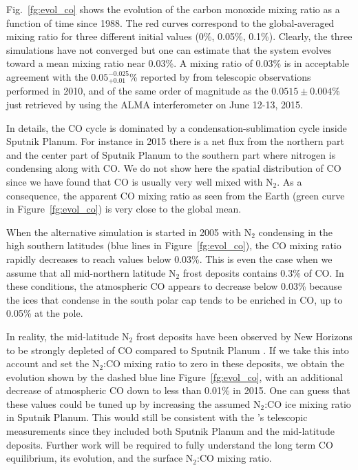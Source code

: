 Fig.~\ref{fg:evol_co} shows the evolution of the carbon monoxide mixing ratio as a
function of time since 1988. 
The red curves correspond to the global-averaged mixing ratio for three 
different initial values (0\%, 0.05\%, 0.1\%). Clearly, the
three simulations have not converged but one can estimate that the system evolves toward a
mean mixing ratio near 0.03\%.
A mixing ratio of 0.03\%  is in acceptable agreement with 
the $0.05_{+0.01}^{-0.025}$\% reported by \cite{Lell:11co} from 
telescopic observations performed in 2010, and of the same order of magnitude as
the $0.0515\pm0.004$\% just 
retrieved by \cite{Lell:16} using the ALMA interferometer on June 12-13, 2015. 
 
In details, the CO cycle is dominated by a condensation-sublimation cycle inside
Sputnik Planum. For instance in 2015 there is a net flux from the northern part and
the center part of Sputnik Planum to the southern part where nitrogen is 
condensing along with CO. 
We do not show here the spatial distribution of CO since we
have found that CO is usually very well mixed with N$_2$. As a consequence, the apparent
CO mixing ratio as seen from the Earth (green curve in Figure~\ref{fg:evol_co}) 
is very close to the global mean. 

When the alternative simulation is started in 2005 with N$_2$ condensing in the high
southern latitudes (blue lines in Figure~\ref{fg:evol_co}), the CO mixing
ratio rapidly decreases to reach values below 0.03\%. 
This is even the case when we assume that all mid-northern latitude N$_2$ frost deposits contains
0.3\% of CO.  In these conditions, the atmospheric CO appears to decrease below 0.03\% 
because the ices that condense in the south polar cap tends to be enriched in
CO, up to 0.05\% at the pole. 

In reality, the mid-latitude N$_2$ frost
deposits have been observed by New Horizons to be strongly 
depleted of CO compared to Sputnik Planum 
\citep{Grun:16}.  If we
take this into account and set the N$_2$:CO mixing ratio to zero in these deposits,
we obtain the evolution shown by the dashed blue line Figure~\ref{fg:evol_co}, with
an additional decrease of atmospheric CO down to less than 0.01\% in 2015. 
One can guess that these values could be tuned up by increasing the assumed N$_2$:CO
ice mixing ratio in Sputnik Planum. This would still be consistent with the 
\cite{Merl:15}'s telescopic  measurements since they included both Sputnik Planum and the mid-latitude
deposits. Further work will be required to fully understand 
the long term CO equilibrium, its evolution, and
the surface N$_2$:CO mixing ratio.




